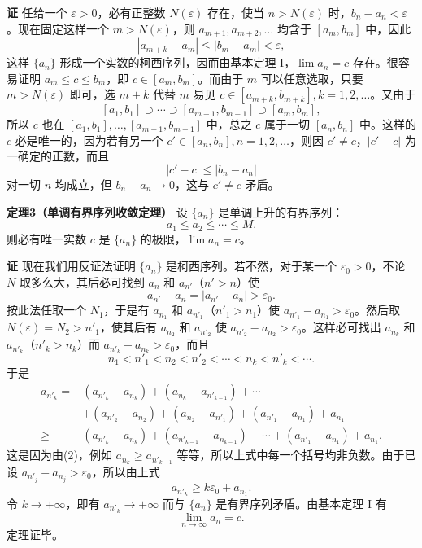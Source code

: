 \noindent\textbf{证}\quad
任给一个 $\varepsilon>0$，必有正整数 $N(\varepsilon)$ 存在，使当 $n>N(\varepsilon)$ 时，$b_n-a_n<\varepsilon$。现在固定这样一个 $m>N(\varepsilon)$，则 $a_{m+1},a_{m+2},\ldots$ 均含于 $[a_m,b_m]$ 中，因此
\[
 |a_{m+k}-a_m|\le |b_m-a_m|<\varepsilon,
\]
这样 $\{a_n\}$ 形成一个实数的柯西序列，因而由基本定理 I，$\lim a_n=c$ 存在。很容易证明 $a_m\le c\le b_m$，即 $c\in[a_m,b_m]$。而由于 $m$ 可以任意选取，只要 $m>N(\varepsilon)$ 即可，选 $m+k$ 代替 $m$ 易见 $c\in[a_{m+k},b_{m+k}],k=1,2,\ldots$。又由于
\[
 [a_1,b_1]\supset\cdots\supset[a_{m-1},b_{m-1}]\supset[a_m,b_m],
\]
所以 $c$ 也在 $[a_1,b_1],\ldots,[a_{m-1},b_{m-1}]$ 中，总之 $c$ 属于一切 $[a_n,b_n]$ 中。这样的 $c$ 必是唯一的，因为若有另一个 $c'\in[a_n,b_n],n=1,2,\ldots$，则因 $c'\ne c$，$|c'-c|$ 为一确定的正数，而且
\[
 |c'-c|\le |b_n-a_n|
\]
对一切 $n$ 均成立，但 $b_n-a_n\to0$，这与 $c'\ne c$ 矛盾。

\noindent\textbf{定理3（单调有界序列收敛定理）}\quad
设 $\{a_n\}$ 是单调上升的有界序列：
\[
 a_1\le a_2\le\cdots\le M.
\]
则必有唯一实数 $c$ 是 $\{a_n\}$ 的极限，$\lim a_n=c$。

\noindent\textbf{证}\quad
现在我们用反证法证明 $\{a_n\}$ 是柯西序列。若不然，对于某一个 $\varepsilon_0>0$，不论 $N$ 取多么大，其后必可找到 $a_n$ 和 $a_{n'}$（$n'>n$）使
\[
 a_{n'}-a_n=|a_{n'}-a_n|>\varepsilon_0.
\]
按此法任取一个 $N_1$，于是有 $a_{n_1}$ 和 $a_{n'_1}$（$n'_1>n_1$）使 $a_{n'_1}-a_{n_1}>\varepsilon_0$。然后取 $N(\varepsilon)=N_2>n'_1$，使其后有 $a_{n_2}$ 和 $a_{n'_2}$ 使 $a_{n'_2}-a_{n_2}>\varepsilon_0$。这样必可找出 $a_{n_k}$ 和 $a_{n'_k}$（$n'_k>n_k$）而 $a_{n'_k}-a_{n_k}>\varepsilon_0$，而且
\begin{equation}
 n_1<n'_1<n_2<n'_2<\cdots<n_k<n'_k<\cdots.
 \tag{2}
\end{equation}
于是
\[
 \begin{aligned}
 a_{n'_k}={}&(a_{n'_k}-a_{n_k})+(a_{n_k}-a_{n'_{k-1}})+\cdots\\
 &+(a_{n'_2}-a_{n_2})+(a_{n_2}-a_{n'_1})+(a_{n'_1}-a_{n_1})+a_{n_1}\\
 \ge{}&(a_{n'_k}-a_{n_k})+(a_{n'_{k-1}}-a_{n_{k-1}})+\cdots+(a_{n'_1}-a_{n_1})+a_{n_1}.
 \end{aligned}
\]
这是因为由(2)，例如 $a_{n_k}\ge a_{n'_{k-1}}$ 等等，所以上式中每一个括号均非负数。由于已设 $a_{n'_j}-a_{n_j}>\varepsilon_0$，所以由上式
\[
 a_{n'_k}\ge k\varepsilon_0+a_{n_1}.
\]
令 $k\to+\infty$，即有 $a_{n'_k}\to+\infty$ 而与 $\{a_n\}$ 是有界序列矛盾。由基本定理 I 有
\[
 \lim_{n\to\infty}a_n=c.
\]
定理证毕。


